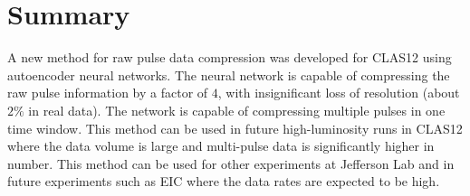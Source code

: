 \section{Summary}

A new method for raw pulse data compression was developed for CLAS12 using autoencoder neural networks. The neural network is capable
of compressing the raw pulse information by a factor of $4$, with insignificant loss of resolution (about $2\%$ in real data).
The network is capable of compressing multiple pulses in one time window. This method can be used in future high-luminosity runs
in CLAS12 where the data volume is large and multi-pulse data is significantly higher in number. This method can be used for other
experiments at Jefferson Lab and in future experiments such as EIC where the data rates are expected to be high.

